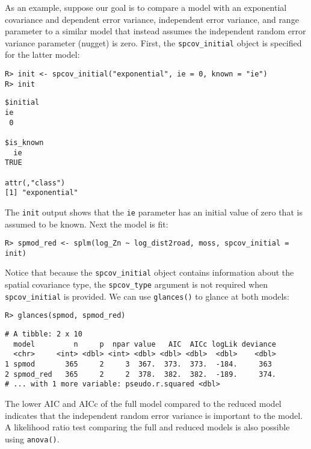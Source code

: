 \documentclass[10pt,letterpaper]{article}
\begin{document}
As an example, suppose our goal is to compare a model with an
exponential covariance and dependent error variance, independent error
variance, and range parameter to a similar model that instead assumes
the independent random error variance parameter (nugget) is zero. First,
the \texttt{spcov\_initial} object is specified for the latter model:

\begin{verbatim}
R> init <- spcov_initial("exponential", ie = 0, known = "ie")
R> init
\end{verbatim}

\begin{verbatim}
$initial
ie 
 0 

$is_known
  ie 
TRUE 

attr(,"class")
[1] "exponential"
\end{verbatim}

The \texttt{init} output shows that the \texttt{ie} parameter has an
initial value of zero that is assumed to be known. Next the model is
fit:

\begin{verbatim}
R> spmod_red <- splm(log_Zn ~ log_dist2road, moss, spcov_initial = init)
\end{verbatim}

Notice that because the \texttt{spcov\_initial} object contains
information about the spatial covariance type, the \texttt{spcov\_type}
argument is not required when \texttt{spcov\_initial} is provided. We
can use \texttt{glances()} to glance at both models:

\begin{verbatim}
R> glances(spmod, spmod_red)
\end{verbatim}

\begin{verbatim}
# A tibble: 2 x 10
  model         n     p  npar value   AIC  AICc logLik deviance
  <chr>     <int> <dbl> <int> <dbl> <dbl> <dbl>  <dbl>    <dbl>
1 spmod       365     2     3  367.  373.  373.  -184.     363 
2 spmod_red   365     2     2  378.  382.  382.  -189.     374.
# ... with 1 more variable: pseudo.r.squared <dbl>
\end{verbatim}

The lower AIC and AICc of the full model compared to the reduced model
indicates that the independent random error variance is important to the
model. A likelihood ratio test comparing the full and reduced models is
also possible using \texttt{anova()}.
\end{document}
